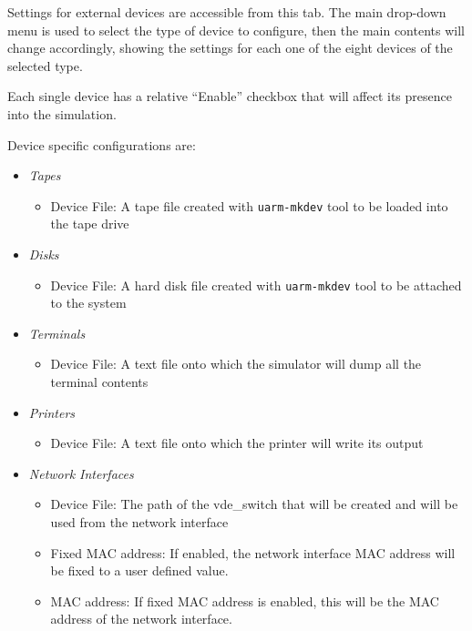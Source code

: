 
Settings for external devices are accessible from this tab.
The main drop-down menu is used to select the type of device to configure, then the main contents will change accordingly, showing the settings for each one of the eight devices of the selected type.

Each single device has a relative ``Enable'' checkbox that will affect its presence into the simulation.

Device specific configurations are:
\begin{itemize}
	\item \emph{Tapes}
		\begin{itemize}
			\item Device File: A tape file created with \texttt{uarm-mkdev} tool to be loaded into the tape drive
		\end{itemize}
	\item \emph{Disks}
		\begin{itemize}
			\item Device File: A hard disk file created with \texttt{uarm-mkdev} tool to be attached to the system
		\end{itemize}
	\item \emph{Terminals}
		\begin{itemize}
			\item Device File: A text file onto which the simulator will dump all the terminal contents
		\end{itemize}
	\item \emph{Printers}
		\begin{itemize}
			\item Device File: A text file onto which the printer will write its output
		\end{itemize}
	\item \emph{Network Interfaces}
		\begin{itemize}
			\item Device File: The path of the vde\_switch that will be created and will be used from the network interface
			\item Fixed MAC address: If enabled, the network interface MAC address will be fixed to a user defined value.
			\item MAC address: If fixed MAC address is enabled, this will be the MAC address of the network interface.
		\end{itemize}
\end{itemize}

